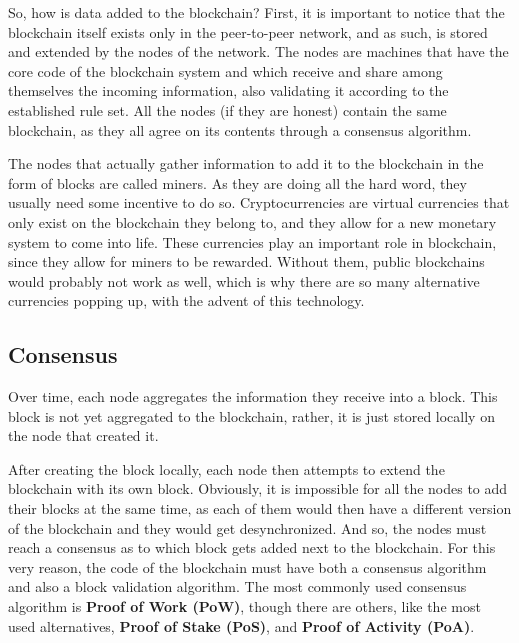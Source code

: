     So, how is data added to the blockchain? First, it is important to notice that the blockchain itself exists only in the peer-to-peer network, and as such, is stored and extended by the nodes of the network. The nodes are machines that have the core code of the blockchain system and which receive and share among themselves the incoming information, also validating it according to the established rule set. All the nodes (if they are honest) contain the same blockchain, as they all agree on its contents through a consensus algorithm. 
    
     The nodes that actually gather information to add it to the blockchain in the form of blocks are called miners. As they are doing all the hard word, they usually need some incentive to do so. Cryptocurrencies are virtual currencies that only exist on the blockchain they belong to, and they allow for a new monetary system to come into life. These currencies play an important role in blockchain, since they allow for miners to be rewarded. Without them, public blockchains would probably not work as well, which is why there are so many alternative currencies popping up, with the advent of this technology. 
    
    \subsection{Consensus}
    Over time, each node aggregates the information they receive into a block. This block is not yet aggregated to the blockchain, rather, it is just stored locally on the node that created it. 
    
    
    After creating the block locally, each node then attempts to extend the blockchain with its own block. Obviously, it is impossible for all the nodes to add their blocks at the same time, as each of them would then have a different version of the blockchain and they would get desynchronized. And so, the nodes must reach a consensus as to which block gets added next to the blockchain. For this very reason, the code of the blockchain must have both a consensus algorithm and also a block validation algorithm. The most commonly used consensus algorithm is \textbf{Proof of Work (PoW)}, though there are others, like the most used alternatives, \textbf{Proof of Stake (PoS)}, and \textbf{Proof of Activity (PoA)}. 
    
